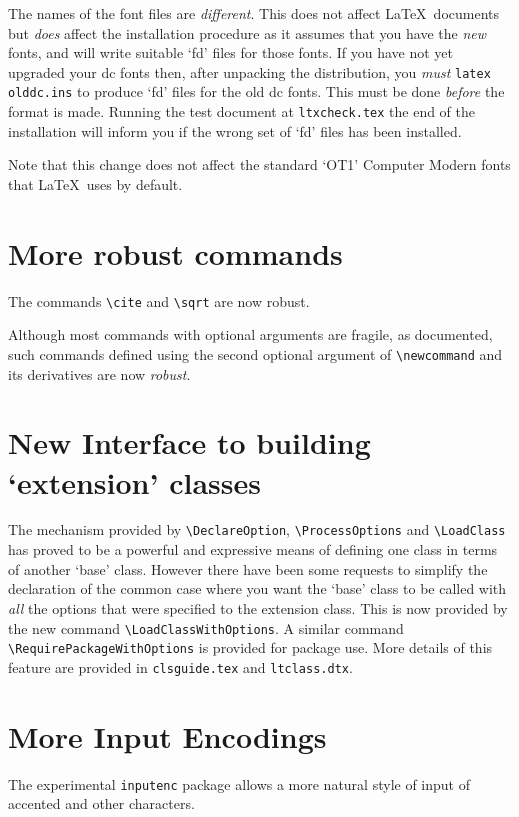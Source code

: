 \documentclass{ltnews}
\providecommand\pkg[1]{\texttt{#1}}
\providecommand\file[1]{\texttt{#1}}
\begin{document}
The names of the font files are \emph{different}. This does not affect
\LaTeX\ documents but \emph{does} affect the installation procedure as
it assumes that you have the \emph{new} fonts, and will write suitable
`fd' files for those fonts. If you have not yet upgraded your dc fonts
then, after unpacking the distribution, you \emph{must}
\verb|latex olddc.ins| to produce `fd' files for the old dc fonts.
This must be done \emph{before} the format is made. Running the test
document at \file{ltxcheck.tex} the end of the installation will
inform you if the wrong set of `fd' files has been installed.

Note that this change does not affect the standard `OT1' Computer
Modern fonts that \LaTeX\ uses by default.

\section{More robust commands}

The commands \verb|\cite| and \verb|\sqrt| are now robust.

Although most commands with optional arguments are fragile, as
documented, such commands defined using the second optional argument
of \verb|\newcommand| and its derivatives are now \emph{robust}.

\section{New Interface to building `extension' classes}

The mechanism provided by \verb|\DeclareOption|, \verb|\ProcessOptions|
and \verb|\LoadClass| has proved to be a powerful and expressive means
of defining one class in terms of another `base' class. However there
have been some requests to simplify the declaration of the common case
where you want the `base' class to be called with \emph{all} the
options that were specified to the extension class.  This is now
provided by the new command \verb|\LoadClassWithOptions|. A similar
command \verb|\RequirePackageWithOptions| is provided for package use.
More details of this feature are provided in \file{clsguide.tex} and
\file{ltclass.dtx}.

\section{More Input Encodings}

The experimental \pkg{inputenc} package allows a more natural style
of input of accented and other characters.
\end{document}

